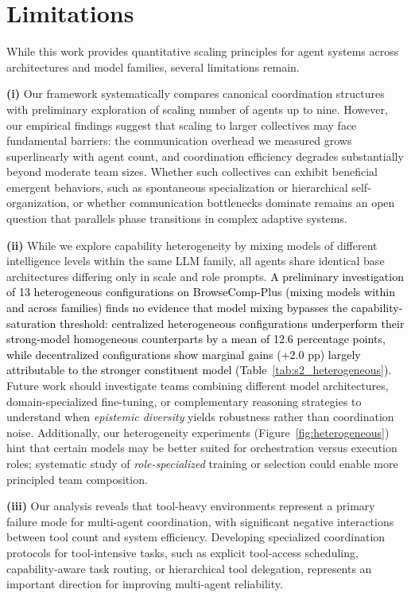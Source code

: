 \section{Limitations}

While this work provides quantitative scaling principles for agent systems across architectures and model families, several limitations remain. 

\textbf{(i)} Our framework systematically compares canonical coordination structures with preliminary exploration of scaling number of agents up to nine. However, our empirical findings suggest that scaling to larger collectives may face fundamental barriers: the communication overhead we measured grows superlinearly with agent count, and coordination efficiency degrades substantially beyond moderate team sizes. Whether such collectives can exhibit beneficial emergent behaviors, such as spontaneous specialization or hierarchical self-organization, or whether communication bottlenecks dominate remains an open question that parallels phase transitions in complex adaptive systems. 

\textbf{(ii)} While we explore capability heterogeneity by mixing models of different intelligence levels within the same LLM family, all agents share identical base architectures differing only in scale and role prompts. \textcolor{black}{A preliminary investigation of 13 heterogeneous configurations on BrowseComp-Plus (mixing models within and across families) finds no evidence that model mixing bypasses the capability-saturation threshold: centralized heterogeneous configurations underperform their strong-model homogeneous counterparts by a mean of 12.6 percentage points, while decentralized configurations show marginal gains (+2.0 pp) largely attributable to the stronger constituent model (Table~\ref{tab:s2_heterogeneous}).} Future work should investigate teams combining different model architectures, domain-specialized fine-tuning, or complementary reasoning strategies to understand when \emph{epistemic diversity} yields robustness rather than coordination noise. Additionally, our heterogeneity experiments (Figure~\ref{fig:heterogeneous}) hint that certain models may be better suited for orchestration versus execution roles; systematic study of \emph{role-specialized} training or selection could enable more principled team composition. 

\textbf{(iii)} Our analysis reveals that tool-heavy environments represent a primary failure mode for multi-agent coordination, with significant negative interactions between tool count and system efficiency. Developing specialized coordination protocols for tool-intensive tasks, such as explicit tool-access scheduling, capability-aware task routing, or hierarchical tool delegation, represents an important direction for improving multi-agent reliability. 

